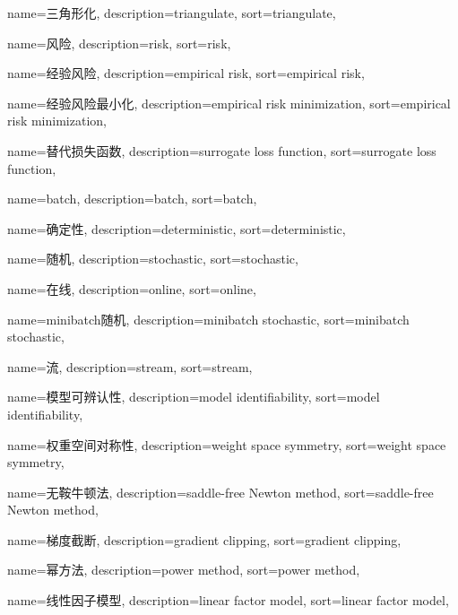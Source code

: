 {
	name=三角形化,
	description={triangulate},
	sort={triangulate},
}

{
  name=风险,
  description={risk},
  sort={risk},
}

{
  name=经验风险,
  description={empirical risk},
  sort={empirical risk},
}

{
  name=经验风险最小化,
  description={empirical risk minimization},
  sort={empirical risk minimization},
}

{
  name=替代损失函数,
  description={surrogate loss function},
  sort={surrogate loss function},
}

{
  name=batch,
  description={batch},
  sort={batch},
}

{
  name=确定性,
  description={deterministic},
  sort={deterministic},
}

{
  name=随机,
  description={stochastic},
  sort={stochastic},
}

{
  name=在线,
  description={online},
  sort={online},
}

{
  name=minibatch随机, %
  description={minibatch stochastic},
  sort={minibatch stochastic},
}

{
  name=流,
  description={stream},
  sort={stream},
}

{
  name=模型可辨认性,
  description={model identifiability},
  sort={model identifiability},
}

{
  name=权重空间对称性,
  description={weight space symmetry},
  sort={weight space symmetry},
}

{
  name=无鞍牛顿法,
  description={saddle-free Newton method},
  sort={saddle-free Newton method},
}

{
  name=梯度截断,
  description={gradient clipping},
  sort={gradient clipping},
}

{
  name=幂方法,
  description={power method},
  sort={power method},
}

{
  name=线性因子模型,
  description={linear factor model},
  sort={linear factor model},
}

